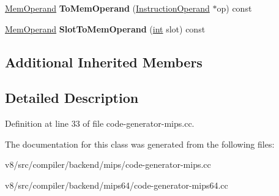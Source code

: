 \begin{DoxyCompactItemize}
\mbox{\hyperlink{classv8_1_1internal_1_1MemOperand}{Mem\+Operand}} {\bfseries To\+Mem\+Operand} (\mbox{\hyperlink{classv8_1_1internal_1_1compiler_1_1InstructionOperand}{Instruction\+Operand}} $\ast$op) const
\item 
\mbox{\label{classv8_1_1internal_1_1compiler_1_1MipsOperandConverter_aab5f7ba2273594ccdba3d091ba049e00}} 
\mbox{\hyperlink{classv8_1_1internal_1_1MemOperand}{Mem\+Operand}} {\bfseries Slot\+To\+Mem\+Operand} (\mbox{\hyperlink{classint}{int}} slot) const
\end{DoxyCompactItemize}
\subsection*{Additional Inherited Members}


\subsection{Detailed Description}


Definition at line 33 of file code-\/generator-\/mips.\+cc.



The documentation for this class was generated from the following files\+:\begin{DoxyCompactItemize}
\item 
v8/src/compiler/backend/mips/code-\/generator-\/mips.\+cc\item 
v8/src/compiler/backend/mips64/code-\/generator-\/mips64.\+cc\end{DoxyCompactItemize}
